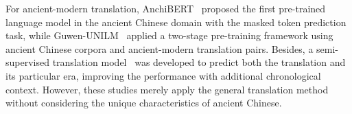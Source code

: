 For ancient-modern translation, AnchiBERT~\cite{DBLP:journals/corr/abs-2009-11473} proposed the first pre-trained language model in the ancient Chinese domain with the masked token prediction task, while Guwen-UNILM~\cite{DBLP:conf/nlpcc/YangCC21} applied a two-stage pre-training framework using ancient Chinese corpora and ancient-modern translation pairs. Besides, a semi-supervised translation model~\cite{DBLP:conf/acl-lchange/ChangSYD21} was developed to predict both the translation and its particular era, improving the performance with additional chronological context. However, these studies merely apply the general translation method without considering the unique characteristics of ancient Chinese.



